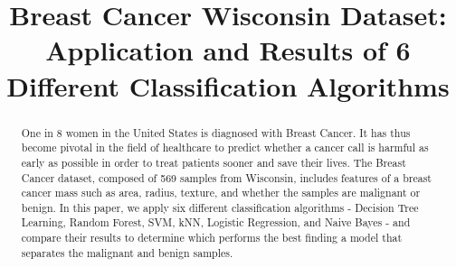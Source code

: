 \documentclass[conference]{IEEEtran}
\begin{document}
\title{Breast Cancer Wisconsin Dataset:\\ 
Application and Results of 6 Different Classification Algorithms}

\author{
\and
{}
\and
{}
}

\maketitle


\begin{abstract}
One in 8 women in the United States is diagnosed with Breast Cancer. It has thus become pivotal in the field of healthcare to predict whether a cancer call is harmful as early as possible in order to treat patients sooner and save their lives. The Breast Cancer dataset, composed of 569 samples from Wisconsin, includes features of a breast cancer mass such as area, radius, texture, and whether the samples are malignant or benign. In this paper, we apply six different classification algorithms - Decision Tree Learning, Random Forest, SVM, kNN, Logistic Regression, and Naive Bayes - and compare their results to determine which performs the best finding a model that separates the malignant and benign samples.
\end{abstract}
\end{document}
